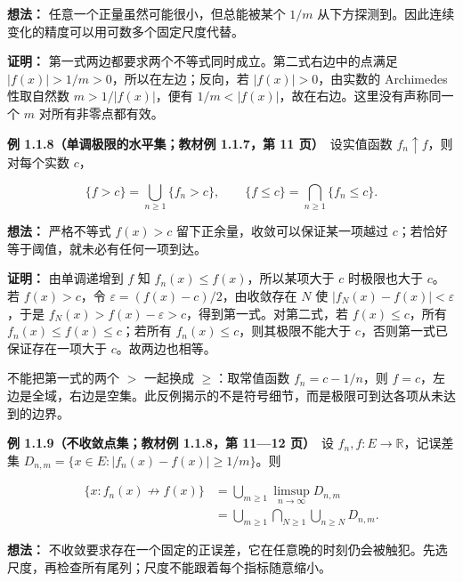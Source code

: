 \documentclass[11pt,a4paper]{article}
\begin{document}
\textbf{想法：} 任意一个正量虽然可能很小，但总能被某个 \(1/m\)
从下方探测到。因此连续变化的精度可以用可数多个固定尺度代替。

\textbf{证明：} 第一式两边都要求两个不等式同时成立。第二式右边中的点满足
\(|f(x)|>1/m>0\)，所以在左边；反向，若 \(|f(x)|>0\)，由实数的 Archimedes
性取自然数 \(m>1/|f(x)|\)，便有
\(1/m<|f(x)|\)，故在右边。这里没有声称同一个 \(m\) 对所有非零点都有效。

\textbf{例 1.1.8（单调极限的水平集；教材例 1.1.7，第 11
页）}　设实值函数 \(f_n\uparrow f\)，则对每个实数 \(c\)，

\begin{equation*}
\{f>c\}=\bigcup_{n\ge1}\{f_n>c\},\qquad
\{f\le c\}=\bigcap_{n\ge1}\{f_n\le c\}.
\tag{1.1.23}
\end{equation*}

\textbf{想法：} 严格不等式 \(f(x)>c\) 留下正余量，收敛可以保证某一项越过
\(c\)；若恰好等于阈值，就未必有任何一项到达。

\textbf{证明：} 由单调递增到 \(f\) 知 \(f_n(x)\le f(x)\)，所以某项大于
\(c\) 时极限也大于 \(c\)。若 \(f(x)>c\)，令
\(\varepsilon=(f(x)-c)/2\)，由收敛存在 \(N\) 使
\(|f_N(x)-f(x)|<\varepsilon\)，于是
\(f_N(x)>f(x)-\varepsilon>c\)，得到第一式。对第二式，若
\(f(x)\le c\)，所有 \(f_n(x)\le f(x)\le c\)；若所有
\(f_n(x)\le c\)，则其极限不能大于 \(c\)，否则第一式已保证存在一项大于
\(c\)。故两边也相等。

不能把第一式的两个 \(>\) 一起换成 \(\ge\)：取常值函数 \(f_n=c-1/n\)，则
\(f=c\)，左边是全域，右边是空集。此反例揭示的不是符号细节，而是极限可到达各项从未达到的边界。

\textbf{例 1.1.9（不收敛点集；教材例 1.1.8，第 11---12 页）}　设
\(f_n,f:E\to\mathbb R\)，记误差集
\(D_{n,m}=\{x\in E:|f_n(x)-f(x)|\ge1/m\}\)。则

\begin{equation*}
\begin{aligned}
\{x:f_n(x)\not\to f(x)\}
 &=\bigcup_{m\ge1}\limsup_{n\to\infty}D_{n,m}\\
 &=\bigcup_{m\ge1}\bigcap_{N\ge1}\bigcup_{n\ge N}D_{n,m}.
\end{aligned}\tag{1.1.24}
\end{equation*}

\textbf{想法：}
不收敛要求存在一个固定的正误差，它在任意晚的时刻仍会被触犯。先选尺度，再检查所有尾列；尺度不能跟着每个指标随意缩小。
\end{document}
